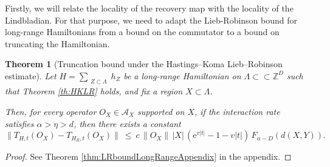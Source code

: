 \documentclass[11pt]{article}
\numberwithin{equation}{section}
\numberwithin{figure}{section}
\numberwithin{table}{section}
\theoremstyle{definition}
\theoremstyle{plain}
\newtheorem{thm}{Theorem}[section]
\theoremstyle{remark}
\newcommand{\A}{\mathcal{A}}
\newcommand{\La}{\Lambda}
\newcommand{\summ}[1]{\sum\limits_{\substack{ #1 }}}
\newcommand{\abs}[1]{\left \vert#1\right\vert}
\begin{document}
Firstly, we will relate the locality of the recovery map with the locality of the Lindbladian. For that purpose, we need to adapt the Lieb-Robinson bound for long-range Hamiltonians from a bound on the commutator to a bound on truncating the Hamiltonian.

\medskip
\begin{thm}[Truncation bound under the Hastings--Koma Lieb--Robinson estimate]\label{thm:LRboundLongRange}
Let $H = \summ{Z\subset \La} h_Z$ be a long-range Hamiltonian on $\La \subset \subset \mathbb{Z}^D$ such that Theorem \ref{th:HKLR} holds, and fix a region $X\subset \La$. 

Then, for every operator $O_X\in\A_X$ supported on $X$, if the interaction rate satisfies $\alpha>\eta>d$, 
then there exists a constant 
\begin{equation}
\big\|T_{H,t}(O_X) - T_{H_R,t}(O_X)\big\|
\ \leq\  c\,
\|O_X\|\, \abs{X}\,(\mathrm{e}^{v|t|}-1-v|t|)\,F_{\alpha-D}(d(X,Y)).
\label{eq:difTimeEvolutionsRMain}
\end{equation}


\end{thm}
\begin{proof}
    See Theorem \ref{thm:LRboundLongRangeAppendix} in the appendix.
\end{proof}
\end{document}

